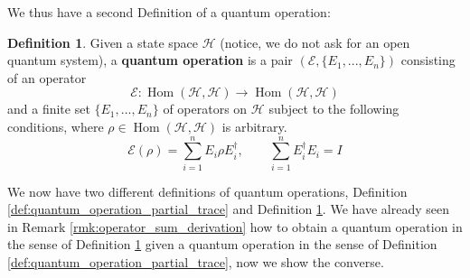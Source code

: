 \documentclass[12pt]{article}
\theoremstyle{plain}
\theoremstyle{definition}
\newtheorem{defn}[thm]{Definition} %
\newcommand{\call}[1]{\mathcal{#1}}
\newcommand{\lto}{\longrightarrow}
\begin{document}
	We thus have a second Definition of a quantum operation:
	\begin{defn}\label{def:operator_sum}
		Given a state space $\call{H}$ (notice, we do not ask for an open quantum system), a \textbf{quantum operation} is a pair $(\call{E}, \lbrace E_1,...,E_n \rbrace)$ consisting of an operator
		\begin{equation}
			\call{E}: \operatorname{Hom}(\call{H},\call{H}) \lto \operatorname{Hom}(\call{H}, \call{H})
			\end{equation}
		and a finite set $\lbrace E_1,...,E_n\rbrace$ of operators on $\call{H}$ subject to the following conditions, where $\rho \in \operatorname{Hom}(\call{H}, \call{H})$ is arbitrary.
		\begin{equation}
			\call{E}(\rho) = \sum_{i = 1}^n E_i \rho E_i^\dagger,\qquad \sum_{i = 1}^n E_i^\dagger E_i = I
			\end{equation}
	\end{defn}
	We now have two different definitions of quantum operations, Definition \ref{def:quantum_operation_partial_trace} and Definition \ref{def:operator_sum}. We have already seen in Remark \ref{rmk:operator_sum_derivation} how to obtain a quantum operation in the sense of Definition \ref{def:operator_sum} given a quantum operation in the sense of Definition \ref{def:quantum_operation_partial_trace}, now we show the converse.
\end{document}
